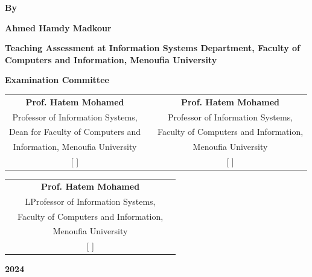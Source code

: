 \begin{titlepage}
\begin{center}
		\textbf{\Large By} \\
		\vspace{0.3cm}

		\textbf{\LARGE  Ahmed Hamdy Madkour} \\
		\vspace{0.1cm}

		\textbf{\large \normalfont Teaching Assessment at Information Systems Department, Faculty of Computers and Information, Menoufia University} \\
		\vspace{0.5cm}

		\textbf{\Large Examination Committee}
		\vspace{0.0cm}

		\begin{tabbing}
			\begin{tabular}{ccc} %
				\textbf{Prof. Hatem Mohamed}      &  & \textbf{Prof. Hatem Mohamed}              \\
				Professor of Information Systems,  &  & Professor of Information Systems,      \\
				Dean for Faculty of Computers and &  & Faculty of Computers and Information,
				\\
				Information, Menoufia University  &  & Menoufia University                   \\
				\hspace{0.1cm} [ \hspace{3.5cm} ] &  & \hspace{0.1cm} [ \hspace{3.5cm} ]\\
			\end{tabular}
		\end{tabbing}
		

        \begin{center} %
            \begin{tabbing}
                \begin{tabular}{ccc} %
                  \hspace{3cm}  &\textbf{Prof. Hatem Mohamed} &\\
                    & LProfessor of Information Systems, &\\
                    & Faculty of Computers and Information, &\\
                    & Menoufia University &\\
                    & \hspace{0.1cm} [ \hspace{3.5cm} ]&
                \end{tabular}
            \end{tabbing}
        \end{center}

		\vspace{0.2cm}
		\textbf{\Large 2024}

	\end{center}
\end{titlepage}
